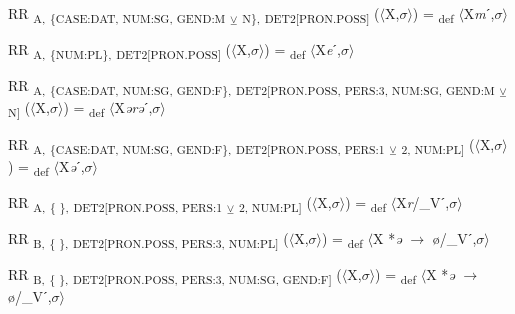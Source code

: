 {\begin{exe}
 RR \textsubscript{A,} \textsubscript{\{CASE:DAT, NUM:SG, GEND:M} \textsubscript{${\veebar}$}\textsubscript{ N\},} \textsubscript{DET2[PRON.POSS]} ($\langle$X,$\sigma $$\rangle$) = \textsubscript{def} $\langle$X\textit{m}ˊ,$\sigma $$\rangle$
\end{exe}

\begin{exe}
 RR \textsubscript{A,} \textsubscript{\{NUM:PL\},} \textsubscript{DET2[PRON.POSS]} ($\langle$X,$\sigma $$\rangle$) = \textsubscript{def} $\langle$X\textit{e}ˊ,$\sigma $$\rangle$
\end{exe}

\begin{exe}
 RR \textsubscript{A,} \textsubscript{\{CASE:DAT, NUM:SG, GEND:F\},} \textsubscript{DET2[PRON.POSS, PERS:3, NUM:SG, GEND:M} \textsubscript{${\veebar}$}\textsubscript{ N]} ($\langle$X,$\sigma $$\rangle$) = \textsubscript{def} $\langle$X\textit{ərə}ˊ,$\sigma $$\rangle$
\end{exe}

\begin{exe}
 RR \textsubscript{A,} \textsubscript{\{CASE:DAT, NUM:SG, GEND:F\},} \textsubscript{DET2[PRON.POSS, PERS:1} \textsubscript{${\veebar}$}\textsubscript{ 2, NUM:PL]} ($\langle$X,$\sigma $$\rangle$) = \textsubscript{def} $\langle$X\textit{ə}ˊ,$\sigma $$\rangle$
\end{exe}

\begin{exe}
 RR \textsubscript{A,} \textsubscript{\{ \},} \textsubscript{DET2[PRON.POSS, PERS:1} \textsubscript{${\veebar}$}\textsubscript{ 2, NUM:PL]} ($\langle$X,$\sigma $$\rangle$) = \textsubscript{def} $\langle$X\textit{r}/\_Vˊ,$\sigma $$\rangle$
\end{exe}

\begin{exe}
 RR \textsubscript{B,} \textsubscript{\{ \},} \textsubscript{DET2[PRON.POSS, PERS:3, NUM:PL]} ($\langle$X,$\sigma $$\rangle$) = \textsubscript{def} $\langle$X *\textit{ə} $\rightarrow$ ø/\_Vˊ,$\sigma $$\rangle$
\end{exe}

\begin{exe}
 RR \textsubscript{B,} \textsubscript{\{ \},} \textsubscript{DET2[PRON.POSS, PERS:3, NUM:SG, GEND:F]} ($\langle$X,$\sigma $$\rangle$) = \textsubscript{def} $\langle$X *\textit{ə} $\rightarrow$ ø/\_Vˊ,$\sigma $$\rangle$
\end{exe}

}

